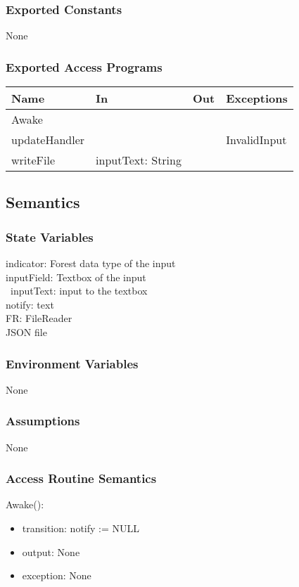 \documentclass[12pt, titlepage]{article}
\begin{document}
\subsubsection{Exported Constants}
None
\subsubsection{Exported Access Programs}

\begin{center}
\begin{tabular}{| l | l | l | p{5cm}|}
\hline
\textbf{Name} & \textbf{In} & \textbf{Out} & \textbf{Exceptions} \\
\hline
Awake &  &  &  \\
\hline
updateHandler &  & & InvalidInput\\
\hline
writeFile & inputText: String &&\\
\hline
\end{tabular}
\end{center}

\subsection{Semantics}

\subsubsection{State Variables}
indicator: Forest data type of the input\\
inputField: Textbox of the input\\\
inputText: input to the textbox\\
notify: text\\
FR: FileReader\\
JSON file\\

\subsubsection{Environment Variables}
None
\subsubsection{Assumptions}
None
\subsubsection{Access Routine Semantics}

\noindent Awake():
\begin{itemize}
\item transition: notify := NULL
\item output: None
\item exception: None
\end{itemize}
\end{document}
